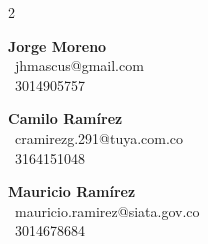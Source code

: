 \documentclass[10pt,a4paper,ragged2e,withhyper]{altacv}
\begin{document}
\begin{paracol}{2}

\begin{cvtags}
\end{cvtags}


\textbf{\textcolor{emphasis}{Jorge Moreno}}\\
\textcolor{accent}{\faEnvelope}\ \textcolor{body}{jhmascus@gmail.com} \\
\textcolor{accent}{\faPhone}\ \textcolor{body}{3014905757}

\medskip

\textbf{\textcolor{emphasis}{Camilo Ramírez}}\\
\textcolor{accent}{\faEnvelope}\ \textcolor{body}{cramirezg.291@tuya.com.co} \\
\textcolor{accent}{\faPhone}\ \textcolor{body}{3164151048}

\medskip

\textbf{\textcolor{emphasis}{Mauricio Ramírez}}\\
\textcolor{accent}{\faEnvelope}\ \textcolor{body}{mauricio.ramirez@siata.gov.co} \\
\textcolor{accent}{\faPhone}\ \textcolor{body}{3014678684}

\end{paracol}
\end{document}
